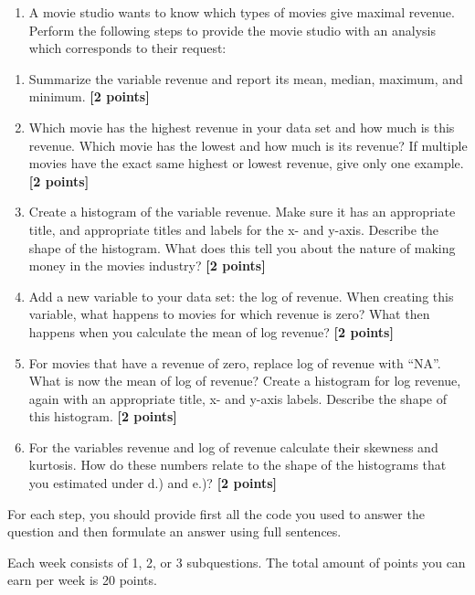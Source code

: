 \documentclass[
]{article}
\providecommand{\tightlist}{%
  \setlength{\itemsep}{0pt}\setlength{\parskip}{0pt}}
\begin{document}
\begin{enumerate}
\def\labelenumi{\arabic{enumi}.}
\setcounter{enumi}{2}
\tightlist
\item
  A movie studio wants to know which types of movies give maximal
  revenue. Perform the following steps to provide the movie studio with
  an analysis which corresponds to their request:
\end{enumerate}

\begin{enumerate}
\def\labelenumi{\alph{enumi}.}
\tightlist
\item
  Summarize the variable revenue and report its mean, median, maximum,
  and minimum. \textbf{[2 points]}
\item
  Which movie has the highest revenue in your data set and how much is
  this revenue. Which movie has the lowest and how much is its revenue?
  If multiple movies have the exact same highest or lowest revenue, give
  only one example. \textbf{[2 points]}
\item
  Create a histogram of the variable revenue. Make sure it has an
  appropriate title, and appropriate titles and labels for the x- and
  y-axis. Describe the shape of the histogram. What does this tell you
  about the nature of making money in the movies industry?
  \textbf{[2 points]}
\item
  Add a new variable to your data set: the log of revenue. When creating
  this variable, what happens to movies for which revenue is zero? What
  then happens when you calculate the mean of log revenue?
  \textbf{[2 points]}
\item
  For movies that have a revenue of zero, replace log of revenue with
  ``NA''. What is now the mean of log of revenue? Create a histogram for
  log revenue, again with an appropriate title, x- and y-axis labels.
  Describe the shape of this histogram. \textbf{[2 points]}
\item
  For the variables revenue and log of revenue calculate their skewness
  and kurtosis. How do these numbers relate to the shape of the
  histograms that you estimated under d.) and e.)? \textbf{[2 points]}
\end{enumerate}

For each step, you should provide first all the code you used to answer
the question and then formulate an answer using full sentences.

Each week consists of 1, 2, or 3 subquestions. The total amount of
points you can earn per week is 20 points.
\end{document}
